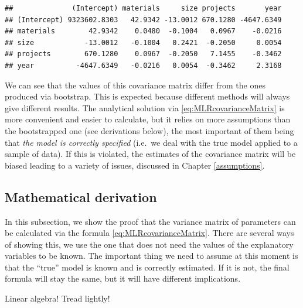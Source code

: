 \documentclass[
]{book}
\theoremstyle{definition}
\theoremstyle{definition}
\theoremstyle{definition}
\theoremstyle{definition}
\theoremstyle{remark}
\begin{document}
\begin{verbatim}
##              (Intercept) materials     size projects       year
## (Intercept) 9323602.8303   42.9342 -13.0012 670.1280 -4647.6349
## materials        42.9342    0.0480  -0.1004   0.0967    -0.0216
## size            -13.0012   -0.1004   0.2421  -0.2050     0.0054
## projects        670.1280    0.0967  -0.2050   7.1455    -0.3462
## year          -4647.6349   -0.0216   0.0054  -0.3462     2.3168
\end{verbatim}

We can see that the values of this covariance matrix differ from the ones produced via bootstrap. This is expected because different methods will always give different results. The analytical solution via \eqref{eq:MLRcovarianceMatrix} is more convenient and easier to calculate, but it relies on more assumptions than the bootstrapped one (see derivations below), the most important of them being that \emph{the model is correctly specified} (i.e.~we deal with the true model applied to a sample of data). If this is violated, the estimates of the covariance matrix will be biased leading to a variety of issues, discussed in Chapter \ref{assumptions}.

\subsection{Mathematical derivation}\label{uncertaintyRegressionCovMaths}

In this subsection, we show the proof that the variance matrix of parameters can be calculated via the formula \eqref{eq:MLRcovarianceMatrix}. There are several ways of showing this, we use the one that does not need the values of the explanatory variables to be known. The important thing we need to assume at this moment is that the ``true'' model is known and is correctly estimated. If it is not, the final formula will stay the same, but it will have different implications.

Linear algebra! Tread lightly!
\end{document}

